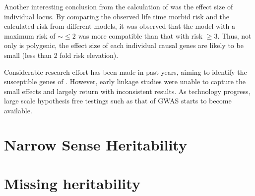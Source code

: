 \documentclass{book}
\newcommand*{\glng}{\glsentrylong}
\begin{document}
	Another interesting conclusion from the calculation of \cite{Risch1990a} was the effect size of individual locus. 
	By comparing the observed life time morbid risk and the calculated risk from different models, it was observed that the model with a maximum risk of $\sim\le2$ was more compatible than that with risk $\ge3$.
	Thus, not only is \glng{scz} polygenic, the effect size of each individual causal genes are likely to be small (less than 2 fold risk elevation).

	Considerable research effort has been made in past years, aiming to identify the susceptible genes of \glng{scz}.
	However, early linkage studies were unable to capture the small effects and largely return with inconsistent results\citep{Harrison2005}. 
	As technology progress, large scale hypothesis free testings such as that of \gls{GWAS} starts to become available.
	
	
	\section{Narrow Sense Heritability}
	\subsection{\glng{gcta}}
	\subsection{\glng{ldsc}}
	
	\section{Missing heritability}
	
\end{document}
